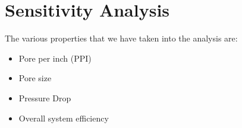 \documentclass[asme2ejs.tex]{subfiles}
\begin{document}
\section{Sensitivity Analysis}
The various properties that we have taken into the analysis are:
\begin{itemize}
\item Pore per inch (PPI)
\item Pore size 
\item Pressure Drop 
\item Overall system efficiency 
\end{itemize}
\end{document}
